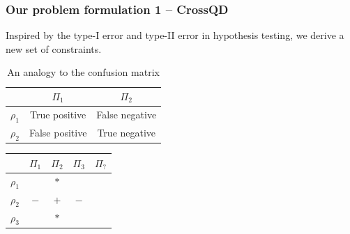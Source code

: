 \documentclass{beamer}
\begin{document}
\begin{frame}
    \frametitle{Our problem formulation 1 -- CrossQD}
    Inspired by the type-I error and type-II error in hypothesis testing, we
    derive a new set of constraints.
    \begin{table}[ht]
        \begin{tabular}{c | c c }
                       & $\Pi_{1}$                          & $\Pi_{2}$                            \\
            \hline
            $\rho_{1}$ & \cellcolor{green!20} True positive & \cellcolor{red!20}   False negative  \\
            $\rho_{2}$ & \cellcolor{red!20} False positive  & \cellcolor{green!20}   True negative \\
        \end{tabular}
        \caption{An analogy to the confusion matrix}
    \end{table}
    \begin{table}[ht]
        \begin{tabular}{c | c c c c}
                       & $\Pi_{1}$              & $\Pi_{2}$                 & $\Pi_{3}$               & $\Pi_{?}$             \\
            \hline
            $\rho_{1}$ & \cellcolor{green!20}   & \cellcolor{red!20}    $*$ & \cellcolor{red!20}      & \cellcolor{yellow!30} \\
            $\rho_{2}$ & \cellcolor{red!20} $-$ & \cellcolor{green!20} $+$  & \cellcolor{red!20}  $-$ & \cellcolor{yellow!30} \\
            $\rho_{3}$ & \cellcolor{red!20}     & \cellcolor{red!20}   $*$  & \cellcolor{green!20}    & \cellcolor{yellow!30} \\
        \end{tabular}
    \end{table}
\end{frame}
\end{document}
